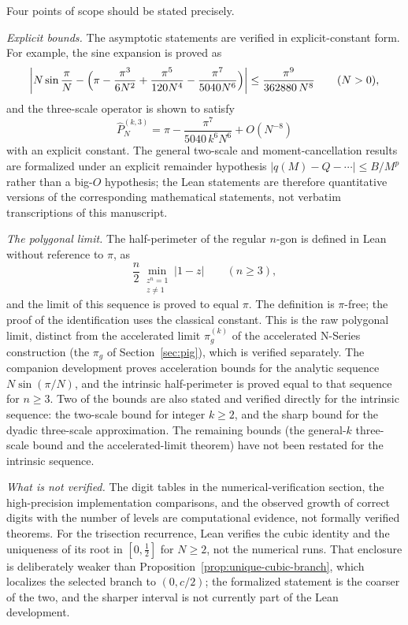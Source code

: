 \documentclass[12pt]{article}
\theoremstyle{definition}
\theoremstyle{remark}
\begin{document}
Four points of scope should be stated precisely.

\emph{Explicit bounds.} The asymptotic statements are verified in
explicit-constant form. For example, the sine expansion is proved as
\[
\left|N\sin\frac{\pi}{N}
-\Bigl(\pi-\frac{\pi^3}{6N^2}+\frac{\pi^5}{120N^4}-\frac{\pi^7}{5040N^6}\Bigr)\right|
\le \frac{\pi^9}{362880\,N^8}
\qquad (N>0),
\]
and the three-scale operator is shown to satisfy
\[
\widehat P_N^{(k,3)}=\pi-\frac{\pi^7}{5040\,k^6N^6}+O(N^{-8})
\]
with an explicit constant. The general two-scale and moment-cancellation results are formalized under an
explicit remainder hypothesis $|q(M)-Q-\cdots|\le B/M^{p}$ rather than a
big-$O$ hypothesis; the Lean statements are therefore quantitative versions
of the corresponding mathematical statements, not verbatim transcriptions of this manuscript.

\emph{The polygonal limit.} The half-perimeter of the regular $n$-gon is
defined in Lean without reference to $\pi$, as
\[
\frac{n}{2}\min_{\substack{z^n=1\\ z\ne 1}}|1-z| \qquad (n\ge 3),
\]
and the limit of this sequence is proved to equal $\pi$. The definition is
$\pi$-free; the proof of the identification uses the classical constant.
This is the raw polygonal limit, distinct from the accelerated limit
$\pi_g^{(k)}$ of the accelerated N-Series construction (the $\pi_g$ of
Section~\ref{sec:pig}), which is verified separately.
The companion development proves acceleration bounds for the analytic sequence
$N\sin(\pi/N)$, and the intrinsic half-perimeter is proved equal to that
sequence for $n\ge 3$. Two of the bounds are also stated and verified
directly for the intrinsic sequence: the two-scale bound
for integer $k\ge 2$, and the sharp bound for the dyadic three-scale approximation. The remaining bounds (the general-$k$ three-scale bound and
the accelerated-limit theorem) have not been restated for the
intrinsic sequence.

\emph{What is not verified.} The digit tables in the numerical-verification section, the high-precision implementation comparisons, and the observed
growth of correct digits with the number of levels are
computational evidence, not formally verified theorems. For the trisection
recurrence, Lean verifies the cubic identity and the uniqueness of its root
in $[0,\tfrac12]$ for $N\ge 2$, not the numerical runs.  That enclosure is
deliberately weaker than
Proposition~\ref{prop:unique-cubic-branch}, which localizes the selected branch
to $(0,c/2)$; the formalized statement is the coarser of the two, and the
sharper interval is not currently part of the Lean development.
\end{document}
